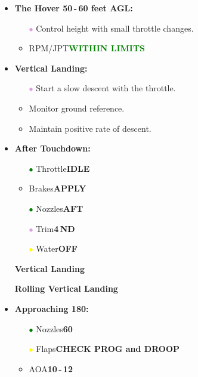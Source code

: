 \documentclass[a4paper,12pt,dvipsnames]{letter}
\newcommand{\button}[1]{\textbf{#1}}
\newcommand{\Deg}{\textdegree{}}
\newcommand{\ok}[1]{\textcolor{Green}{\textbf{#1}}}
\newcommand{\gi}{\textcolor{Green}{$\bullet$\;}}
\newcommand{\yi}{\textcolor{Yellow}{$\bullet$\;}}
\newcommand{\vi}{\textcolor{Plum}{$\bullet$\;}}
\begin{document}
{\begin{itemize}
\begin{itemize}
\end{itemize}
\item \button{The Hover 50\,-\,60 feet AGL:}
\begin{itemize}
 \item[\vi] Control height with small throttle changes.
 \item RPM/JPT\dotfill\ok{WITHIN LIMITS}
\end{itemize}
\item \button{Vertical Landing:}
\begin{itemize}
 \item[\vi] Start a slow descent with the throttle.
 \item Monitor ground reference.
 \item Maintain positive rate of descent.
\end{itemize}
\item \button{After Touchdown:}
\begin{itemize}
\item[\gi] Throttle\dotfill\button{IDLE}
\item Brakes\dotfill\button{APPLY}
\item[\gi] Nozzles\dotfill\button{AFT}
\item[\vi] Trim\dotfill\button{4\Deg\,ND}
\item[\yi] Water\dotfill\button{OFF}
\end{itemize}
\end{itemize}
\newpage
\begin{itemize}
\item[] {\LARGE\textbf{Vertical Landing}}
\end{itemize}
\newpage
\begin{itemize}
\item[] {\LARGE\textbf{Rolling Vertical Landing}}
\item \button{Approaching 180:}
\begin{itemize}
 \item[\gi] Nozzles\dotfill\button{60\Deg}
 \item[\yi] Flaps\dotfill\button{CHECK PROG and DROOP}
 \item AOA\dotfill\button{10\Deg\,-\,12\Deg}
\end{itemize}

\end{itemize}}
\end{document}
